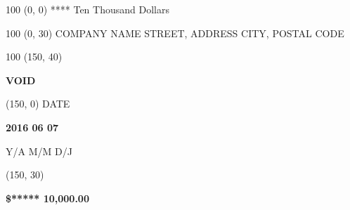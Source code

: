 \documentclass{article}%
\begin{document}
%
\normalsize%
\begin{minipage}{\textwidth}%
\begin{textblock}{100}%
(0, 0)%
\noindent%
**** Ten Thousand Dollars%
\end{textblock}%
\begin{textblock}{100}%
(0, 30)%
\noindent%
COMPANY NAME%
\newline%
STREET, ADDRESS%
\newline%
CITY, POSTAL CODE%
\end{textblock}%
\begin{textblock}{100}%
(150, 40)%
\noindent%
\begin{Huge}%
\textbf{VOID}%
\end{Huge}%
\end{textblock}%
\begin{textblock}{80}%
(150, 0)%
\noindent%
DATE%
\begin{large}%
\textbf{2016 06 07\newline%
}%
\end{large}%
\hspace*{10mm}%
\begin{small}%
Y/A M/M D/J%
\end{small}%
\end{textblock}%
\begin{textblock}{70}%
(150, 30)%
\noindent%
\begin{large}%
\textbf{\$***** 10,000.00}%
\end{large}%
\end{textblock}%
\vspace*{100mm}%
\end{minipage}%
\end{document}
